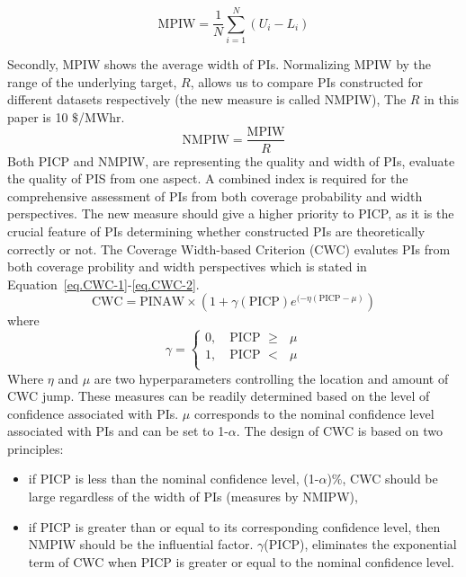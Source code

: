 \documentclass[review]{elsarticle}
\begin{document}
          \begin{equation}
            \text{MPIW} = \frac{1}{N} \sum_{i=1}^{N} (U_{i}-L_{i})
            \label{eq.MPIW}
          \end{equation}

          Secondly, MPIW shows the average width of PIs.
          Normalizing MPIW by the range of the underlying target, $R$, allows us to compare PIs constructed for different datasets respectively (the new measure is called NMPIW),
          The $R$ in this paper is 10 $\$$/MWhr.
          \begin{equation}
            \text{NMPIW} = \frac{\text{MPIW}}{R}
            \label{eq.NMPIW}
          \end{equation}
          Both PICP and NMPIW, are representing the quality and width of PIs, evaluate the quality of PIS from one aspect.
          A combined index is required for the comprehensive assessment of PIs from both coverage probability and width perspectives.
          The new measure should give a higher priority to PICP, as it is the crucial feature of PIs determining whether constructed PIs are theoretically correctly or not.
          The Coverage Width-based Criterion (CWC) evalutes PIs from both coverage probility and width perspectives which is stated in Equation~\ref{eq.CWC-1}-\ref{eq.CWC-2}.
          \begin{equation}
            \text{CWC}=\text{PINAW} \times (1+\gamma(\text{PICP})e^{(-\eta(\text{PICP}-\mu)})
            \label{eq.CWC-1}
          \end{equation}
          where
          \begin{equation}
            \gamma =
                  \begin{cases}
                    0, \quad \text{PICP $\geq$ $\mu$} \\
                    1, \quad \text{PICP $<$ $\mu$} \\
                  \end{cases}
            \label{eq.CWC-2}
          \end{equation}
          Where $\eta$ and $\mu$ are two hyperparameters controlling the location and amount of CWC jump.
          These measures can be readily determined based on the level of confidence associated with PIs.
          $\mu$ corresponds to the nominal confidence level associated with PIs and can be set to 1-$\alpha$.
          The design of CWC is based on two principles:

          \begin{itemize}
            \item if PICP is less than the nominal confidence level, (1-$\alpha$)$\%$, CWC should be large regardless of the width of PIs (measures by NMIPW),
            \item if PICP is greater than or equal to its corresponding confidence level, then NMPIW should be the influential factor.
            $\gamma$(PICP), eliminates the exponential term of CWC when PICP is greater or equal to the nominal confidence level.
          \end{itemize}
\end{document}
